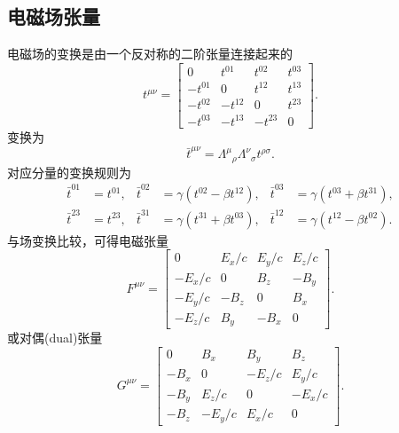 \subsection{电磁场张量}
电磁场的变换是由一个反对称的二阶张量连接起来的
\[
    t^{\mu\nu}=
    \begin{bmatrix}
        0&t^{01}&t^{02}&t^{03}\\
        -t^{01}&0&t^{12}&t^{13}\\
        -t^{02}&-t^{12}&0&t^{23}\\
        -t^{03}&-t^{13}&-t^{23}&0
    \end{bmatrix}.
\]
变换为 
\[
    \bar t^{\mu\nu}=\Lambda^\mu{}_\rho\Lambda^\nu{}_\sigma t^{\rho\sigma}.
\]
对应分量的变换规则为
\begin{align*}
    \bar t^{01}&=t^{01},&\bar t^{02}&=\gamma(t^{02}-\beta t^{12}),&\bar t^{03}&=\gamma(t^{03}+\beta t^{31}),\\
    \bar t^{23}&=t^{23},&\bar t^{31}&=\gamma(t^{31}+\beta t^{03}),&\bar t^{12}&=\gamma(t^{12}-\beta t^{02}).
\end{align*}
与场变换比较，可得电磁张量
\begin{equation}
    F^{\mu\nu}=
    \begin{bmatrix}
        0&E_x/c&E_y/c&E_z/c\\
        -E_x/c&0&B_z&-B_y\\
        -E_y/c&-B_z&0&B_x\\
        -E_z/c&B_y&-B_x&0
    \end{bmatrix}.
\end{equation}
或对偶(dual)张量
\begin{equation}
    G^{\mu\nu}=
    \begin{bmatrix}
        0&B_x&B_y&B_z\\
        -B_x&0&-E_z/c&E_y/c\\
        -B_y&E_z/c&0&-E_x/c\\
        -B_z&-E_y/c&E_x/c&0
    \end{bmatrix}.
\end{equation}
